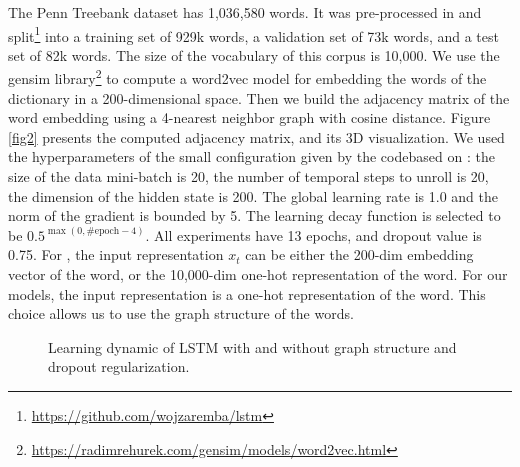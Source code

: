 \documentclass{article} %
\begin{document}
The Penn Treebank dataset has 1,036,580 words. It was pre-processed in \cite{zaremba2014recurrent} and split\footnote{\url{https://github.com/wojzaremba/lstm}} into a training set of 929k words, a validation set of 73k words, and a test set of 82k words. The size of the vocabulary of this corpus is 10,000. We use the gensim library\footnote{\url{https://radimrehurek.com/gensim/models/word2vec.html}} to compute a word2vec model \citep{word2vec} for embedding the words of the dictionary in a 200-dimensional space. Then we build the adjacency matrix of the word embedding using a 4-nearest neighbor graph with cosine distance. Figure \ref{fig2} presents the computed adjacency matrix, and its 3D visualization. We used the hyperparameters of the small configuration given by the code\footnotemark[6] based on \cite{zaremba2014recurrent}: the size of the data mini-batch is 20, the number of temporal steps to unroll is 20, the dimension of the hidden state is 200. The global learning rate is 1.0 and the norm of the gradient is bounded by 5. The learning decay function is selected to be $0.5^{\max(0,\textrm{\#epoch}-4)}$. All experiments have 13 epochs, and dropout value is 0.75. For \cite{zaremba2014recurrent}, the input representation $x_t$ can be either the 200-dim embedding vector of the word, or the 10,000-dim one-hot representation of the word. For our models, the input representation is a one-hot representation of the word. This choice allows us to use the graph structure of the words.

\begin{figure}[t]
	\centering
	\hfill
		\caption{Learning dynamic of LSTM with and without graph structure and dropout regularization.}
	\label{fig3}
\end{figure}
\end{document}
